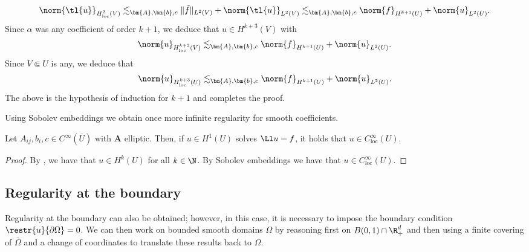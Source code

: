 \documentclass[
    a4paper,
    DIV=14,
    abstract=true,
    numbers=noenddot
]{scrartcl}
\begin{document}
\begin{hint}
\begin{align*}
        \norm{\tl{u}}_{H^{2}_{\mathrm{loc}} (V)} \lesssim_{\bm{A},\bm{b},c} \|\tilde{f}\|_{L^2(V)}+\norm{\tl{u}}_{L^2(V)} \lesssim_{\bm{A},\bm{b},c} \norm{f}_{H^{k+1}(U)}+\norm{u}_{L^2(U)}.
    \end{align*}
    Since $\alpha$ was any coefficient of order $k+1$, we deduce that $u \in H^{k+3}(V) $ with
    \begin{align*}
        \norm{u}_{H^{k+3}_{\mathrm{loc}} (V)} \lesssim_{\bm{A},\bm{b},c} \norm{f}_{H^{k+1}(U)}+\norm{u}_{L^2(U)}.
    \end{align*}
    Since $V\Subset U$ is any, we deduce that
    \begin{align*}
        \norm{u}_{H^{k+3}_{\mathrm{loc}} (U)} \lesssim_{\bm{A},\bm{b},c} \norm{f}_{H^{k+1}(U)}+\norm{u}_{L^2(U)}.
    \end{align*}
    The above is the hypothesis of induction for $k+1$ and completes the proof.
\end{hint}

Using Sobolev embeddings we obtain once more infinite regularity for smooth coefficients.
\begin{theorem}\label{infinite interior regularity2}
    Let $A_{ij}, b_i,c \in C^{\infty}(\overline{U} )$ with $\bm{A}$ elliptic. Then, if $u \in H^1(U)$ solves $\Ll u=f$, it holds that $u \in C _{\mathrm{loc}}^\infty(U)$.
\end{theorem}
\begin{proof}
    By , we have that $u \in H^k(U)$ for all $k \in \N$. By Sobolev embeddings we have that $u \in C^\infty_{\mathrm{loc}}(U)$.
\end{proof}
\subsection{Regularity at the boundary}
Regularity at the boundary can also be obtained; however, in this case, it is necessary to impose the boundary condition $\restr{u}{\partial \Omega }=0$.  We can then work on bounded smooth domains $\Omega $  by reasoning first on $B(0,1) \cap \R^d_+$ and then using a finite covering of $\overline{\Omega } $ and a  change of coordinates to translate these results back to $\Omega$.
\end{document}
